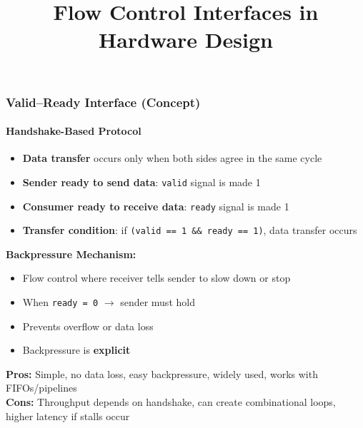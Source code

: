 \documentclass{beamer}
\title{Flow Control Interfaces in Hardware Design}
\author{}
\date{}
\begin{document}
\frame{\titlepage}

\begin{frame}
\frametitle{Valid--Ready Interface (Concept)}
\framesubtitle{Handshake-Based Protocol}

\begin{itemize}
    \item \textbf{Data transfer} occurs only when both sides agree in the same cycle
    \item \textbf{Sender ready to send data}: \texttt{valid} signal is made 1
    \item \textbf{Consumer ready to receive data}: \texttt{ready} signal is made 1
    \item \textbf{Transfer condition}: if \texttt{(valid == 1 \&\& ready == 1)}, data transfer occurs
\end{itemize}

\vspace{0.3cm}
\textbf{Backpressure Mechanism:}
\begin{itemize}
    \item Flow control where receiver tells sender to slow down or stop
    \item When \texttt{ready = 0} $\rightarrow$ sender must hold
    \item Prevents overflow or data loss
    \item Backpressure is \textbf{explicit}
\end{itemize}

\vspace{0.3cm}
\textbf{Pros:} Simple, no data loss, easy backpressure, widely used, works with FIFOs/pipelines \\
\textbf{Cons:} Throughput depends on handshake, can create combinational loops, higher latency if stalls occur

\end{frame}
\end{document}
